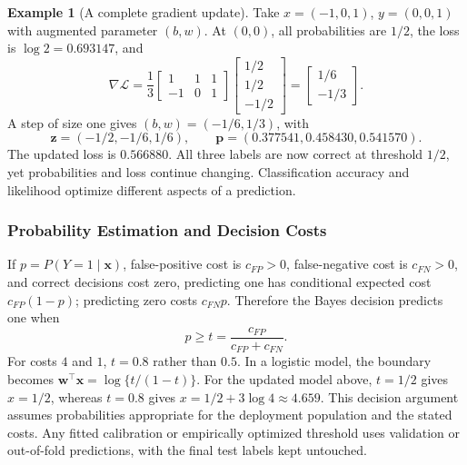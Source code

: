 \documentclass[11pt,twoside]{article}
\numberwithin{equation}{section}
\newcommand{\vect}[1]{\bm{#1}}
\newcommand{\Loss}{\mathcal{L}}
\theoremstyle{plain}
\theoremstyle{definition}
\newtheorem{example}[theorem]{Example}
\theoremstyle{remark}
\begin{document}
\begin{example}[A complete gradient update]
Take $x=(-1,0,1)$, $y=(0,0,1)$ with augmented parameter $(b,w)$. At $(0,0)$, all probabilities are $1/2$, the loss is $\log2=0.693147$, and
\[
\nabla\Loss=\frac13\begin{bmatrix}1&1&1\\-1&0&1\end{bmatrix}
\begin{bmatrix}1/2\\1/2\\-1/2\end{bmatrix}
=\begin{bmatrix}1/6\\-1/3\end{bmatrix}.
\]
A step of size one gives $(b,w)=(-1/6,1/3)$, with
\[
\vect z=(-1/2,-1/6,1/6),\qquad
\vect p=(0.377541,0.458430,0.541570).
\]
The updated loss is $0.566880$. All three labels are now correct at threshold $1/2$, yet probabilities and loss continue changing. Classification accuracy and likelihood optimize different aspects of a prediction.
\end{example}

\subsubsection{Probability Estimation and Decision Costs}
\label{sec:cost-sensitive}
If $p=P(Y=1\mid\vect x)$, false-positive cost is $c_{FP}>0$, false-negative cost is $c_{FN}>0$, and correct decisions cost zero, predicting one has conditional expected cost $c_{FP}(1-p)$; predicting zero costs $c_{FN}p$. Therefore the Bayes decision predicts one when
\[
p\ge t=\frac{c_{FP}}{c_{FP}+c_{FN}}.
\]
For costs $4$ and $1$, $t=0.8$ rather than $0.5$. In a logistic model, the boundary becomes $\vect w^\top\vect x=\log\{t/(1-t)\}$. For the updated model above, $t=1/2$ gives $x=1/2$, whereas $t=0.8$ gives $x=1/2+3\log4\approx4.659$. This decision argument assumes probabilities appropriate for the deployment population and the stated costs. Any fitted calibration or empirically optimized threshold uses validation or out-of-fold predictions, with the final test labels kept untouched.
\end{document}
